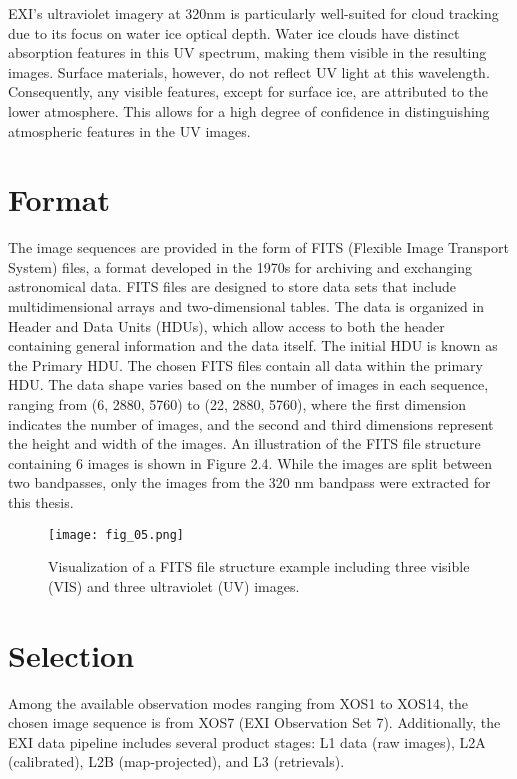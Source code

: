 EXI’s ultraviolet imagery at 320nm is particularly well-suited for cloud tracking due to its focus on water ice optical depth. Water ice clouds have distinct absorption features in this UV spectrum, making them visible in the resulting images. Surface materials, however, do not reflect UV light at this wavelength. Consequently, any visible features, except for surface ice, are attributed to the lower atmosphere. This allows for a high degree of confidence in distinguishing atmospheric features in the UV images.

\section{Format}

The image sequences are provided in the form of FITS (Flexible Image Transport System) files, a format developed in the 1970s for archiving and exchanging astronomical data\cite{NasaFITS}. FITS files are designed to store data sets that include multidimensional arrays and two-dimensional tables. The data is organized in Header and Data Units (HDUs), which allow access to both the header containing general information and the data itself. The initial HDU is known as the Primary HDU. 
The chosen FITS files contain all data within the primary HDU. The data shape varies based on the number of images in each sequence, ranging from (6, 2880, 5760) to (22, 2880, 5760), where the first dimension indicates the number of images, and the second and third dimensions represent the height and width of the images. An illustration of the FITS file structure containing 6 images is shown in Figure 2.4. While the images are split between two bandpasses, only the images from the 320 nm bandpass were extracted for this thesis. 
\FloatBarrier
\begin{figure}[h!] 
    \centering
    \texttt{[image: fig\_05.png]}
    \caption{Visualization of a FITS file structure example including three visible (VIS) and three ultraviolet (UV) images.}
\end{figure}
\FloatBarrier
\section{Selection}

Among the available observation modes ranging from XOS1 to XOS14, the chosen image sequence is from XOS7 (EXI Observation Set 7). Additionally, the EXI data pipeline includes several product stages: L1 data (raw images), L2A (calibrated), L2B (map-projected), and L3 (retrievals)\cite{Jeppesen2021}. 

